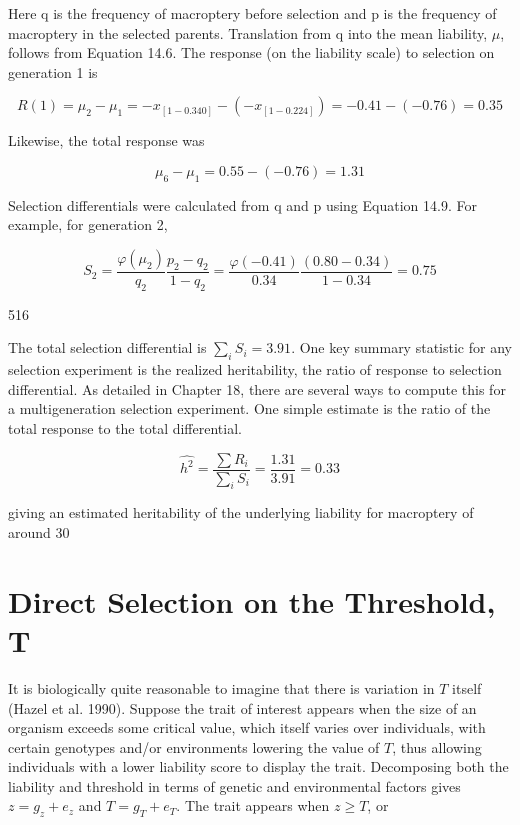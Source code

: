 \documentclass{article}
\begin{document}
Here q is the frequency of macroptery before selection and p is the frequency of macroptery in the selected parents. Translation from q into the mean liability,  $ \mu $, follows from Equation 14.6. The response (on the liability scale) to selection on generation 1 is

\begin{equation}
R(1)=\mu_{2}-\mu_{1}=-x_{[1-0.340]}-(-x_{[1-0.224]})=-0.41-(-0.76)=0.35
\end{equation}

Likewise, the total response was

\begin{equation}
\mu_{6}-\mu_{1}=0.55-(-0.76)=1.31
\end{equation}

Selection differentials were calculated from q and p using Equation 14.9. For example, for generation 2,

\begin{equation}
S_{2}=\frac{\varphi(\mu_{2})}{q_{2}}\frac{p_{2}-q_{2}}{1-q_{2}}=\frac{\varphi(-0.41)}{0.34}\frac{(0.80-0.34)}{1-0.34}=0.75
\end{equation}

516

The total selection differential is  $ \sum_{i} S_{i} = 3.91 $. One key summary statistic for any selection experiment is the realized heritability, the ratio of response to selection differential. As detailed in Chapter 18, there are several ways to compute this for a multigeneration selection experiment. One simple estimate is the ratio of the total response to the total differential.

\begin{equation}
\widehat{h^{2}}=\frac{\sum R_{i}}{\sum_{i}S_{i}}=\frac{1.31}{3.91}=0.33
\end{equation}

giving an estimated heritability of the underlying liability for macroptery of around 30%

\section{Direct Selection on the Threshold, T}
It is biologically quite reasonable to imagine that there is variation in  $ T $ itself (Hazel et al. 1990). Suppose the trait of interest appears when the size of an organism exceeds some critical value, which itself varies over individuals, with certain genotypes and/or environments lowering the value of  $ T $, thus allowing individuals with a lower liability score to display the trait. Decomposing both the liability and threshold in terms of genetic and environmental factors gives  $ z = g_z + e_z $ and  $ T = g_T + e_T $. The trait appears when  $ z \geq T $, or
\end{document}
